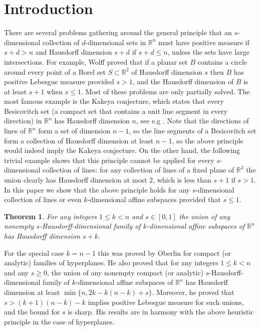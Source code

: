 \documentclass[a4paper]{amsart}
\newtheorem{theorem}{Theorem}[section]
\theoremstyle{definition} \newtheorem{remark}[theorem]{Remark}
\def\rr{{\mathbb R}}
\def\R{{\mathbb R}}
\def\su{\subset}
\begin{document}
\section{Introduction}
There are several problems gathering around the general principle that
an $s$-dimensional collection of $d$-dimensional sets in $\rr^n$ must have positive measure
if $s+d > n$ and Hausdorff dimension $s+d$ if $s+d \leq n$, unless the sets have large
intersections. For example, Wolff \cite{Wo97,Wo00} proved that if a planar 
set $B$ contains
a circle around every point of a Borel set $S\su \R^2$ of Hausdorff dimension 
$s$ then $B$ has positive
Lebesgue measure provided $s >1$, and the Hausdorff dimension of $B$ is
at least $s+1$ when $s\le 1$. Most of these problems are only partially solved. 
The most famous example is the Kakeya conjecture, which states that 
every Besicovitch set (a compact set that contains a unit line segment in 
every direction) in $\R^n$ has Hausdorff dimension $n$, see e.g \cite{Ma15}. 
Note that the directions of lines of 
$\R^n$ form a set of dimension $n-1$, so the line segments of a Besicovitch
set form a collection 
of Hausdorff dimension at least $n-1$, so the above principle
would indeed imply the Kakeya conjecture. 
On the other hand, the following trivial example shows that 
this principle cannot be applied for every $s$-dimensional 
collection of lines: 
for any collection of lines of a fixed plane of $\R^3$  
the union clearly has Hausdorff dimension at most $2$, which is less than
$s+1$ if $s>1$.
In this paper we show that the above principle holds for any $s$-dimensional
collection 
of lines or even $k$-dimensional affine subspaces provided that $s\le 1$.

\begin{theorem}\label{t:simplest}
For any integers $1\le k<n$ and
$s\in [0,1]$ the union of any nonempty $s$-Hausdorff-dimensional family of 
$k$-dimensional affine subspaces
of $\R^n$ has Hausdorff dimension $s+k$.
\end{theorem}

For the special case $k=n-1$ this was proved by Oberlin \cite{Ob} for compact (or analytic) families of hyperplanes.  
He also proved \cite{Ob2} that for any integers $1\le k<n$ and any $s \geq 0$, the union of any nonempty compact (or analytic) $s$-Hausdorff-dimensional family of 
$k$-dimensional affine subspaces of $\R^n$ has Hausdorff dimension at least $\min\{n, 2k-k(n-k)+s\}$. 
Moreover, he proved that $s >(k+1)(n-k)-k$ implies positive Lebesgue measure for such unions, and the bound for $s$ is sharp. 
His results are in harmony with the above heuristic principle in the case of hyperplanes. 
\end{document}
